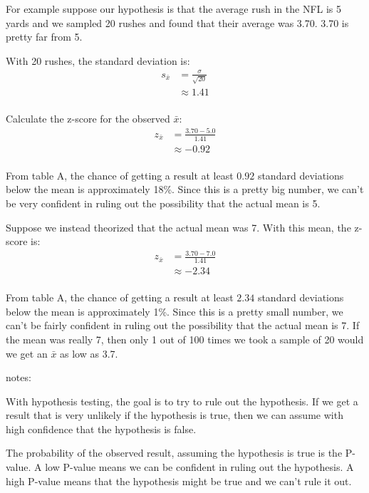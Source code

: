 \documentclass[landscape]{exam}
\begin{document}
  For example suppose our hypothesis is that the average rush in the NFL is 5
  yards and we sampled 20 rushes and found that their average was 3.70. 3.70 is
  pretty far from 5.

  With 20 rushes, the standard deviation is:
  \begin{align*}
    s_{\bar{x}} & = \frac{\sigma}{\sqrt{20}} \\
                & \approx 1.41 \\
  \end{align*}

  Calculate the z-score for the observed $\bar{x}$:
  \begin{align*}
    z_{\bar{x}} & = \frac{3.70 - 5.0}{1.41} \\
                & \approx -0.92 \\
  \end{align*}

  From table A, the chance of getting a result at least $0.92$ standard
  deviations below the mean is approximately 18\%. Since this is a pretty big
  number, we can't be very confident in ruling out the possibility that the
  actual mean is 5.

  Suppose we instead theorized that the actual mean was 7. With this mean, the
  z-score is:
  \begin{align*}
    z_{\bar{x}} & = \frac{3.70 - 7.0}{1.41} \\
                & \approx -2.34 \\
  \end{align*}

  From table A, the chance of getting a result at least $2.34$ standard
  deviations below the mean is approximately 1\%. Since this is a pretty small
  number, we can't be fairly confident in ruling out the possibility that the
  actual mean is 7. If the mean was really 7, then only 1 out of 100 times we
  took a sample of 20 would we get an $\bar{x}$ as low as 3.7.

  notes:
  \begin{itemize*}
    \item With hypothesis testing, the goal is to try to rule out the
      hypothesis. If we get a result that is very unlikely if the hypothesis is
      true, then we can assume with high confidence that the hypothesis is
      false.

    \item The probability of the observed result, assuming the hypothesis is
      true is the P-value. A low P-value means we can be confident in ruling out
      the hypothesis. A high P-value means that the hypothesis might be true and
      we can't rule it out.

  \end{itemize*}
\end{document}
